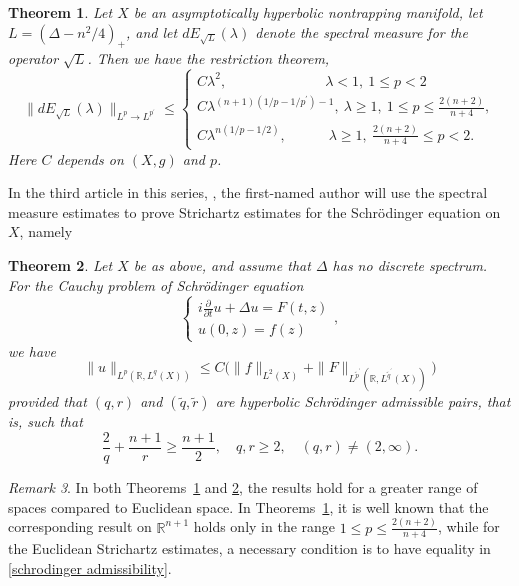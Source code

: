 \documentclass[10pt, a4paper, twoside]{amsart}
\numberwithin{equation}{section}
\newtheorem{theorem}{Theorem}
\theoremstyle{remark}
\newtheorem{remark}[theorem]{Remark}
\begin{document}
\begin{theorem}\label{thm:spec-mult}\cite{Chen-Hassell2}
Let $X$ be an asymptotically hyperbolic nontrapping manifold, let $L = (\Delta - n^2/4)_+$,
and let $dE _{\sqrt{L}}(\lambda)$ denote the spectral measure for the operator $\sqrt{L}$. Then  we have the restriction theorem, 
$$\|dE_{\sqrt{L}}(\lambda)\|_{L^p \rightarrow L^{p^\prime}} \leq 
\begin{cases} 
C \lambda^2, \qquad  \qquad \qquad \quad \lambda < 1, \ 1 \leq p < 2 \\
C \lambda^{(n + 1) (1/p - 1/p^\prime) - 1}, \  \lambda \geq 1, \ 1 \leq p \leq \frac{2(n + 2)}{n + 4}, \\  
C \lambda^{n(1/p - 1/2)}, \qquad \quad \lambda \geq 1, \ \frac{2(n+2)}{n+4} \leq p < 2. 
\end{cases}
$$
Here $C$ depends on $(X, g)$ and $p$. 
\end{theorem}

In the third article in this series, \cite{Chen-Hassell3},  the first-named author will use the spectral measure estimates to prove Strichartz estimates for the Schr\"odinger equation on $X$, namely
\begin{theorem}\label{thm:Strichartz}\cite{Chen-Hassell3}
Let $X$ be as above, and assume that $\Delta$ has no discrete spectrum.  
For the Cauchy problem of Schr\"{o}dinger equation 
\begin{equation*}\label{schrodinger cauchy} \left\{ \begin{array}{c} i \frac{\partial}{\partial t} u  +  \Delta u = F(t, z)  \\  u(0, z) = f(z) \end{array} \right. ,\end{equation*}  we have 
$$\|u\|_{L^p(\mathbb{R}, L^q(X))} \leq C \Big( \|f\|_{L^2(X)} + \|F\|_{L^{\tilde{p}^\prime}(\mathbb{R}, L^{\tilde{q}^\prime}(X))} \Big)
$$ provided that $(q, r)$ and $(\tilde{q}, \tilde{r})$ are \emph{hyperbolic} Schr\"{o}dinger admissible pairs, that is, such that 
\begin{equation}\label{schrodinger admissibility} \frac{2}{q} + \frac{n + 1}{r} \geq \frac{n + 1}{2}, \quad q, r \geq 2, \quad (q, r) \neq (2, \infty).\end{equation}
\end{theorem}

\begin{remark} In both Theorems~\ref{thm:spec-mult} and \ref{thm:Strichartz}, the results hold for a greater range of spaces compared to Euclidean space. In Theorems~\ref{thm:spec-mult}, it is well known that the corresponding result on ${\mathbb{R}}^{n+1}$ holds only in the range $1 \leq p \leq \frac{2(n + 2)}{n + 4}$, while for the Euclidean Strichartz estimates, a necessary condition is to have equality in \eqref{schrodinger admissibility}. 
\end{remark}
\end{document}
